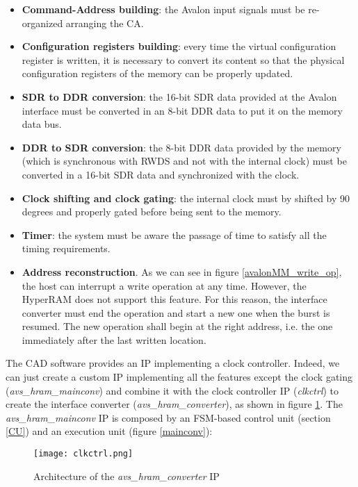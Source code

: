 \documentclass[10pt, english, a4paper, titlepage, oneside]{book}
\begin{document}
\begin{itemize}
    \setlength\itemsep{2mm}
    \item \textbf{Command-Address building}: the Avalon input signals must be re-organized arranging the CA.
    \item \textbf{Configuration registers building}: every time the virtual configuration register is written, it is necessary to convert its content so that the physical configuration registers of the memory can be properly updated.
    \item \textbf{\acrshort{SDR} to \acrshort{DDR} conversion}: the 16-bit SDR data provided at the Avalon interface must be converted in an 8-bit DDR data to put it on the memory data bus.
    \item \textbf{DDR to SDR conversion}: the 8-bit DDR data provided by the memory (which is synchronous with RWDS and not with the internal clock) must be converted in a 16-bit SDR data and synchronized with the clock.
    \item \textbf{Clock shifting and clock gating}: the internal clock must by shifted by 90 degrees and properly gated before being sent to the memory.
    \item \textbf{Timer}: the system must be aware the passage of time to satisfy all the timing requirements.
    \item \textbf{Address reconstruction}. As we can see in figure \ref{avalonMM_write_op}, the host can interrupt a write operation at any time. However, the HyperRAM does not support this feature. For this reason, the interface converter must end the operation and start a new one when the burst is resumed. The new operation shall begin at the right address, i.e. the one immediately after the last written location. 
\end{itemize}
\vspace{4mm}
The CAD software provides an IP implementing a clock controller. Indeed, we can just create a custom IP implementing all the features except the clock gating (\textit{avs\_hram\_mainconv}) and combine it with the clock controller IP (\textit{clkctrl}) to create the interface converter (\textit{avs\_hram\_converter}), as shown in figure \ref{clkctrl}. The \textit{avs\_hram\_mainconv} IP is composed by an \acrshort{FSM}-based control unit (section \ref{CU}) and an execution unit (figure \ref{mainconv}):
\vspace{6mm}
\begin{figure}[H]
    \centering
    \captionsetup{width=15.5cm}
    \texttt{[image: clkctrl.png]}
    \vspace{4mm}
    \caption{\centering Architecture of the \textit{avs\_hram\_converter} IP}
    \label{clkctrl}
\end{figure}
\end{document}
